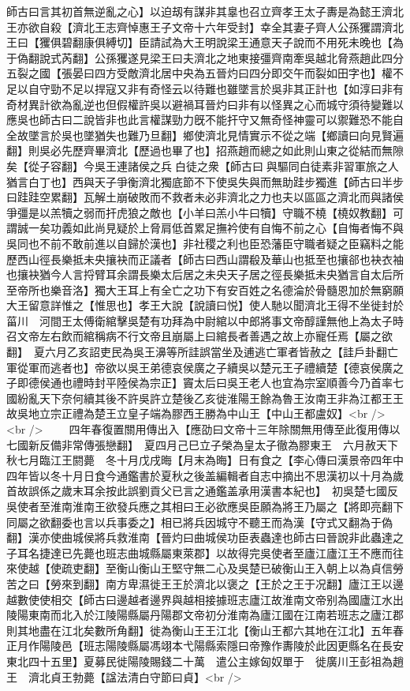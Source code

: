 師古曰言其初首無逆亂之心】以迫刼有謀非其辠也召立齊孝王太子夀是為懿王濟北王亦欲自殺【濟北王志齊悼惠王子文帝十六年受封】幸全其妻子齊人公孫玃謂濟北王曰【玃俱碧翻康俱縛切】臣請試為大王明說梁王通意天子說而不用死未晚也【為于偽翻說式芮翻】公孫玃遂見梁王曰夫濟北之地東接彊齊南牽吳越北脅燕趙此四分五裂之國【張晏曰四方受敵濟北居中央為五晉灼曰四分即交午而裂如田字也】權不足以自守勁不足以捍寇又非有奇怪云以待難也雖墜言於吳非其正計也【如淳曰非有奇材異計欲為亂逆也但假權許吳以避禍耳晉灼曰非有以怪異之心而城守須待變難以應吳也師古曰二說皆非也此言權謀勁力旣不能扞守又無奇怪神靈可以禦難恐不能自全故墜言於吳也墜猶失也難乃旦翻】鄉使濟北見情實示不從之端【鄉讀曰向見賢遍翻】則吳必先歷齊畢濟北【歷過也畢了也】招燕趙而總之如此則山東之從結而無隙矣【從子容翻】今吳王連諸侯之兵白徒之衆【師古曰與驅同白徒素非習軍旅之人猶言白丁也】西與天子爭衡濟北獨底節不下使吳失與而無助跬步獨進【師古曰半步曰跬跬空累翻】瓦解土崩破敗而不救者未必非濟北之力也夫以區區之濟北而與諸侯爭彊是以羔犢之弱而扞虎狼之敵也【小羊曰羔小牛曰犢】守職不橈【橈奴教翻】可謂誠一矣功義如此尚見疑於上脅肩低首累足撫衿使有自悔不前之心【自悔者悔不與吳同也不前不敢前進以自歸於漢也】非社稷之利也臣恐藩臣守職者疑之臣竊料之能歷西山徑長樂抵未央攘袂而正議者【師古曰西山謂殽及華山也抵至也攘郤也袂衣袖也攘袂猶今人言捋臂耳余謂長樂太后居之未央天子居之徑長樂抵未央猶言自太后所至帝所也樂音洛】獨大王耳上有全亡之功下有安百姓之名德淪於骨髓恩加於無窮願大王留意詳惟之【惟思也】孝王大說【說讀曰悦】使人馳以聞濟北王得不坐徙封於菑川　河間王太傅衛綰擊吳楚有功拜為中尉綰以中郎將事文帝醇謹無他上為太子時召文帝左右飲而綰稱病不行文帝且崩屬上曰綰長者善遇之故上亦寵任焉【屬之欲翻】　夏六月乙亥詔吏民為吳王濞等所詿誤當坐及逋逃亡軍者皆赦之【詿戶卦翻亡軍從軍而逃者也】帝欲以吳王弟德哀侯廣之子續吳以楚元王子禮續楚【德哀侯廣之子即德侯通也禮時封平陸侯為宗正】竇太后曰吳王老人也宜為宗室順善今乃首率七國紛亂天下奈何續其後不許吳許立楚後乙亥徙淮陽王餘為魯王汝南王非為江都王王故吳地立宗正禮為楚王立皇子端為膠西王勝為中山王【中山王都盧奴】<br />
<br />
　　四年春復置關用傳出入【應劭曰文帝十三年除關無用傳至此復用傳以七國新反備非常傳張戀翻】　夏四月己巳立子榮為皇太子徹為膠東王　六月赦天下　秋七月臨江王閼薨　冬十月戊戌晦【月末為晦】日有食之【李心傳曰漢景帝四年中四年皆以冬十月日食今通鑑書於夏秋之後盖編輯者自志中摘出不思漢初以十月為歲首故誤係之歲末耳余按此誤劉貢父已言之通鑑盖承用漢書本紀也】　初吳楚七國反吳使者至淮南淮南王欲發兵應之其相曰王必欲應吳臣願為將王乃屬之【將即亮翻下同屬之欲翻委也言以兵事委之】相已將兵因城守不聽王而為漢【守式又翻為于偽翻】漢亦使曲城侯將兵救淮南【晉灼曰曲城侯功臣表蟲達也師古曰晉說非此蟲達之子耳名捷達已先薨也班志曲城縣屬東萊郡】以故得完吳使者至廬江廬江王不應而往來使越【使疏吏翻】至衡山衡山王堅守無二心及吳楚已破衡山王入朝上以為貞信勞苦之曰【勞來到翻】南方卑濕徙王王於濟北以褒之【王於之王于况翻】廬江王以邊越數使使相交【師古曰邊越者邊界與越相接據班志廬江故淮南文帝别為國廬江水出陵陽東南而北入於江陵陽縣屬丹陽郡文帝初分淮南為廬江國在江南若班志之廬江郡則其地盡在江北矣數所角翻】徙為衡山王王江北【衡山王都六其地在江北】五年春正月作陽陵邑【班志陽陵縣屬馮翊本弋陽縣索隱曰帝豫作夀陵於此因更縣名在長安東北四十五里】夏募民徙陽陵賜錢二十萬　遣公主嫁匈奴單于　徙廣川王彭祖為趙王　濟北貞王勃薨【諡法清白守節曰貞】<br />
